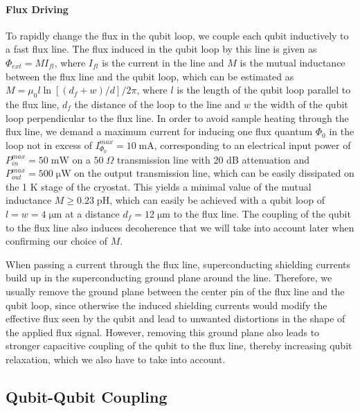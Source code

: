 \paragraph{Flux Driving}

To rapidly change the flux in the qubit loop, we couple each qubit inductively to a fast flux line. The flux induced in the qubit loop by this line is given as $\Phi_{ext}=M I_{fl}$, where $I_{fl}$ is the current in the line and $M$ is the mutual inductance between the flux line and the qubit loop, which can be estimated as $M=\mu_0 l \ln{\left[(d_f+w)/d\right]}/2\pi$, where $l$ is the length of the qubit loop parallel to the flux line, $d_f$ the distance of the loop to the line and $w$ the width of the qubit loop perpendicular to the flux line. In order to avoid sample heating through the flux line, we demand a maximum current for inducing one flux quantum $\Phi_0$ in the loop not in excess of $I_{\Phi_0}^{max}=10\;\mathrm{mA}$, corresponding to an electrical input power of $P^{max}_{in}=50\;\mathrm{mW}$ on a $50 \; \Omega$ transmission line with 20 dB attenuation and $P^{max}_{out}=500\;\mathrm{\mu W}$ on the output transmission line, which can be easily dissipated on the 1 K stage of the cryostat. This yields a minimal value of the mutual inductance $M\ge 0.23\;\mathrm{pH}$, which can easily be achieved with a qubit loop of $l=w=4\;\mathrm{\mu m}$ at a distance $d_f=12\;\mathrm{\mu m}$ to the flux line. The coupling of the qubit to the flux line also induces decoherence that we will take into account later when confirming our choice of $M$.

\smallskip

When passing a current through the flux line, superconducting shielding currents build up in the superconducting ground plane around the line. Therefore, we usually remove the ground plane between the center pin of the flux line and the qubit loop, since otherwise the induced shielding currents would modify the effective flux seen by the qubit and lead to unwanted distortions in the shape of the applied flux signal. However, removing this ground plane also leads to stronger capacitive coupling of the qubit to the flux line, thereby increasing qubit relaxation, which we also have to take into account.

\subsection{Qubit-Qubit Coupling} \label{section:qubit_qubit_coupling}

